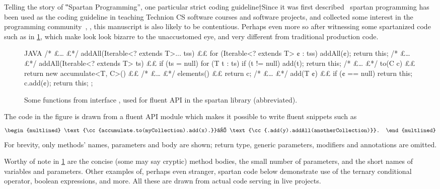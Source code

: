 Telling the story of ‟Spartan Programming”, one particular strict coding
guideline†{Since it was first described~\cite{TOOLS:98:Santa:Barbara}
  spartan programming has been used as the coding guideline in teaching
  Technion CS software courses and software projects, and collected some interest
  in the programming community~\cite{Coding:Horror:Spartan}}, \Java, this
  manuscript is also likely to be contentious. Perhaps even more so after
witnessing some spartanized code such as in \cref{figure:accumulate}, which
make look look bizarre to the unaccustomed eye, and very different from
traditional production \Java code.

\begin{figure}
\caption{\label{figure:accumulate}
  Some functions from interface ,
  used for fluent API in the spartan library (abbreviated).
  }
    \centering
\begin{code}[minipage,width=\columnwidth]{JAVA}
/* £… £*/ addAll(Iterable<? extends T>... tss) {££
  for (Iterable<? extends T> ¢ : tss)
    addAll(¢);
  return this;
}
/* £… £*/ addAll(Iterable<? extends T> ts) {££
  if (ts = null)
    for (T t : ts)
      if (t != null)
        add(t);
  return this;
}
/* £… £*/ to(C c) {££
  return new accumulate<T, C>() {££
    /* £… £*/ elements() {££
        return c;
    }
    /* £… £*/ add(T ¢) {££
        if (¢ == null)
          return this;
        c.add(¢);
        return this;
    }
  };
}
\end{code}
\end{figure}

The code in the figure is drawn from a fluent API module which makes it possible to write fluent snippets
such as \[
  \begin{multlined}
    \text{\cc{accumulate.to(myCollection).add(x).}}⏎
    \text{\cc{.add(y).addAll(anotherCollection)}}.
  \end{multlined}
\]
For brevity, only methods' names, parameters and body are shown;
return type, generic parameters, modifiers and annotations are omitted.

Worthy of note in \cref{figure:accumulate} are the concise (some may say
cryptic) method bodies, the small number of parameters, and the short names of
variables and parameters. Other examples of, perhaps even stranger, spartan
code below demonstrate use of the ternary conditional operator, boolean
expressions, and more. All these are drawn from actual code serving in live
projects.

